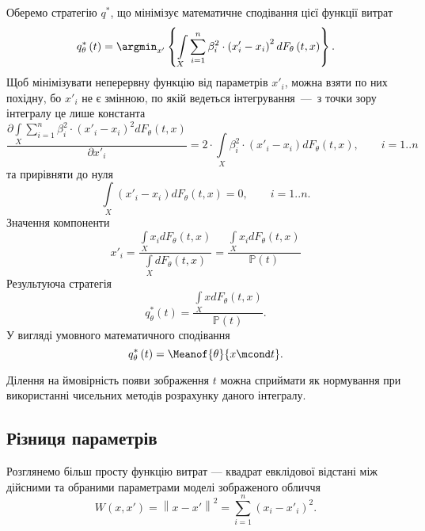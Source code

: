Оберемо стратегію $q^*$,
що мінімізує математичне сподівання цієї функції витрат
\begin{equation*}
  q^*_{\theta}\left( t \right)
  = \argmin_{x'} \left\{
    \int\limits_{X}
        \sum_{i = 1}^n \beta_i^2 \cdot \left( x'_i - x_i \right)^2
        dF_{\theta}\left( t, x \right)
    \right\}.
\end{equation*}
Щоб мінімізувати неперервну функцію від параметрів $x'_i$,
можна взяти по них похідну, бо $x'_i$ не є змінною,
по якій ведеться інтегрування~---~з точки зору інтегралу це лише константа
\begin{equation*}
  \frac{\partial \int\limits_{X}
      \sum\limits_{i = 1}^n \beta_i^2 \cdot \left( x'_i - x_i \right)^2
      dF_{\theta}\left( t, x \right)
  }{\partial x'_i}
  = 2 \cdot \int\limits_{X}
    \beta_i^2 \cdot \left( x'_i - x_i \right) dF_{\theta}\left( t, x \right),
    \qquad i = 1..n
\end{equation*}
та прирівняти до нуля
\begin{equation*}
  \int\limits_{X} \left( x'_i - x_i \right) dF_{\theta}\left( t, x \right) = 0,
  \qquad i = 1..n.
\end{equation*}
Значення компоненти
\begin{equation*}
  x'_i
  = \frac{\int\limits_{X} x_i dF_{\theta}\left( t, x \right)}
         {\int\limits_{X} dF_{\theta}\left( t, x \right)}
  = \frac{\int\limits_{X} x_i dF_{\theta}\left( t, x \right)}
         {\mathbb{P}\left( t \right)}
\end{equation*}
Результуюча стратегія
\begin{equation*}
  q^*_{\theta}\left( t \right)
  = \frac{\int\limits_{X} x dF_{\theta}\left( t, x \right)}{\mathbb{P}\left( t \right)}.
\end{equation*}
У вигляді умовного математичного сподівання
\begin{equation*}
  q^*_{\theta}\left( t \right) = \Meanof{\theta}{x \mcond t}.
\end{equation*}

Ділення на ймовірність появи зображення $t$ можна сприймати як нормування
при використанні чисельних методів розрахунку даного інтегралу.

\subsection{Різниця параметрів}

Розглянемо більш просту функцію витрат ---
квадрат евклідової відстані між дійсними та обраними параметрами
моделі зображеного обличчя
\begin{equation*}
  W \left( x, x' \right)
  = \left\| x - x' \right\|^2
  = \sum_{i = 1}^n \left( x_i - x'_i \right)^2.
\end{equation*}

